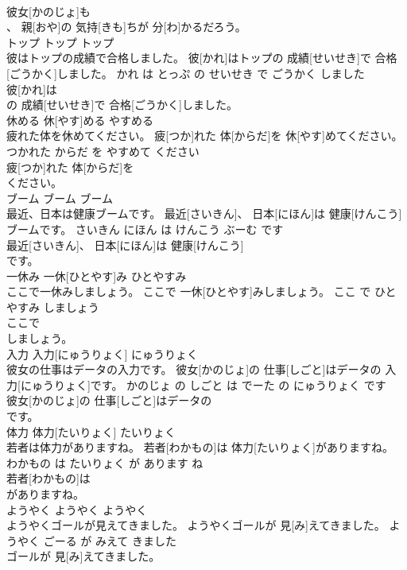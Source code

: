 \documentclass[8pt]{extreport}
\begin{document}
\begin{CJK}{UTF8}{min}
\\	彼女[かのじょ]も
\\	、 親[おや]の 気持[きも]ちが 分[わ]かるだろう。			
\\	トップ	トップ	トップ	
\\	彼はトップの成績で合格しました。	彼[かれ]はトップの 成績[せいせき]で 合格[ごうかく]しました。	かれ は とっぷ の せいせき で ごうかく しました	
\\	彼[かれ]は
\\	の 成績[せいせき]で 合格[ごうかく]しました。			
\\	休める	休[やす]める	やすめる	
\\	疲れた体を休めてください。	疲[つか]れた 体[からだ]を 休[やす]めてください。	つかれた からだ を やすめて ください	
\\	疲[つか]れた 体[からだ]を
\\	ください。			
\\	ブーム	ブーム	ブーム	
\\	最近、日本は健康ブームです。	最近[さいきん]、 日本[にほん]は 健康[けんこう]ブームです。	さいきん にほん は けんこう ぶーむ です	
\\	最近[さいきん]、 日本[にほん]は 健康[けんこう]
\\	です。			
\\	一休み	一休[ひとやす]み	ひとやすみ	
\\	ここで一休みしましょう。	ここで 一休[ひとやす]みしましょう。	ここ で ひとやすみ しましょう	
\\	ここで
\\	しましょう。			
\\	入力	入力[にゅうりょく]	にゅうりょく	
\\	彼女の仕事はデータの入力です。	彼女[かのじょ]の 仕事[しごと]はデータの 入力[にゅうりょく]です。	かのじょ の しごと は でーた の にゅうりょく です	
\\	彼女[かのじょ]の 仕事[しごと]はデータの
\\	です。			
\\	体力	体力[たいりょく]	たいりょく	
\\	若者は体力がありますね。	若者[わかもの]は 体力[たいりょく]がありますね。	わかもの は たいりょく が あります ね	
\\	若者[わかもの]は
\\	がありますね。			
\\	ようやく	ようやく	ようやく	
\\	ようやくゴールが見えてきました。	ようやくゴールが 見[み]えてきました。	ようやく ごーる が みえて きました	
\\	ゴールが 見[み]えてきました。			

\end{CJK}
\end{document}
